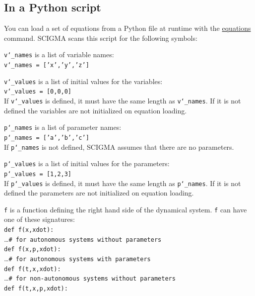 \documentclass[10pt,a4paper,titlepage]{article}
\newcommand{\HL}[1]{\hyperlink{#1}{#1}}
\newcommand{\T}[1]{\texttt{#1}}
\begin{document}
\subsection{In a Python script}
\label{sec::pythoneq}
You can load a set of equations from a Python file at runtime with the \HL{equations} command. SCIGMA scans this script for the following symbols:
\begin{description}
\item{\T{v\char`_names}} is a list of variable names:\\
\T{v\char`_names = ['x','y','z']}
\item{\T{v\char`_values}} is a list of initial values for the variables:\\
\T{v\char`_values = [0,0,0]}\\
If \T{v\char`_values} is defined, it must have the same length as \T{v\char`_names}. If it is not defined the variables are not initialized on equation loading.
\item{\T{p\char`_names}} is a list of parameter names:\\
\T{p\char`_names = ['a','b','c']}\\
If \T{p\char`_names} is not defined, SCIGMA assumes that there are no parameters.
\item{\T{p\char`_values}} is a list of initial values for the parameters:\\
\T{p\char`_values = [1,2,3]}\\
If \T{p\char`_values} is defined, it must have the same length as \T{p\char`_names}. If it is not defined the parameters are not initialized on equation loading.
\item{\T{f}} is a function defining the right hand side of the dynamical system. \T{f} can have one of these signatures:\\
\T{def f(x,xdot):}\\
\hphantom{mmm}\ldots\hspace{8em}\T{\# for autonomous systems without parameters}\\
\T{def f(x,p,xdot):}\\
\hphantom{mmm}\ldots\hspace{8em}\T{\# for autonomous systems with parameters}\\
\T{def f(t,x,xdot):}\\
\hphantom{mmm}\ldots\hspace{8em}\T{\# for non-autonomous systems without parameters}\\
\T{def f(t,x,p,xdot):}\\

\end{description}
\end{document}
